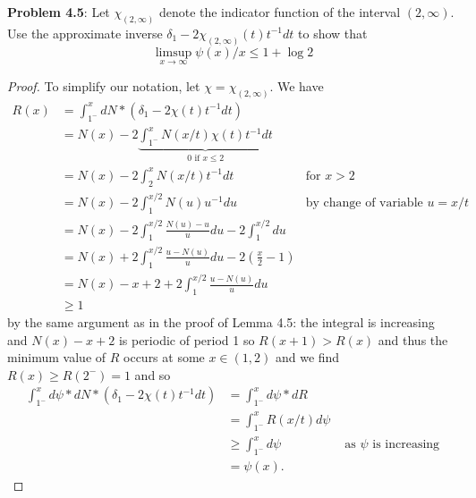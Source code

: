 \documentclass[12pt]{article}
\begin{document}
\fi

\textbf{Problem 4.5}: Let $\chi_{(2,\infty)}$ denote the indicator function of the interval $(2, \infty)$. Use the approximate inverse $\delta_1 - 2 \chi_{(2, \infty)}(t) t^{-1} dt$ to show that
$$\limsup_{x \rightarrow \infty} \psi(x) / x \leq 1 + \log 2$$

\begin{proof}
To simplify our notation, let $\chi = \chi_{(2,\infty)}$. We have
\begin{align*}
R(x) &= \int_{1^-}^x dN * (\delta_1 - 2 \chi(t) t^{-1} dt)\\
&= N(x) - 2 \underbrace{\int_{1^-}^x N(x/t) \chi(t) t^{-1} dt}_{0 \text{ if } x \leq 2}\\
&= N(x) - 2 \int_2^x N(x/t) t^{-1} dt &\text{for } x > 2\\
&= N(x) - 2 \int_1^{x/2} N(u) u^{-1} du &\text{by change of variable } u = x/t\\ %
&= N(x) - 2 \int_1^{x/2} \frac{N(u) - u}{u} du - 2 \int_1^{x/2} du\\
&= N(x) + 2 \int_1^{x/2} \frac{u - N(u)}{u} du - 2 \left( \frac{x}{2} - 1 \right)\\
&= N(x) - x + 2 + 2 \int_1^{x/2} \frac{u - N(u)}{u} du\\
&\geq 1
\end{align*}
by the same argument as in the proof of Lemma 4.5: the integral is increasing and $N(x) - x + 2$ is periodic of period 1 so $R(x + 1) > R(x)$ and thus the minimum value of $R$ occurs at some $x \in (1, 2)$ and we find $R(x) \geq R(2^-) = 1$ and so
\begin{align*}
\int_{1^-}^x d \psi * dN * (\delta_1 - 2 \chi(t) t^{-1} dt) &= \int_{1^-}^x d \psi * dR\\
&= \int_{1^-}^x R(x/t) d\psi\\
&\geq \int_{1^-}^x d\psi &\text{ as } \psi \text{ is increasing}\\
&= \psi(x).
\end{align*}


\end{proof}
\end{document}
